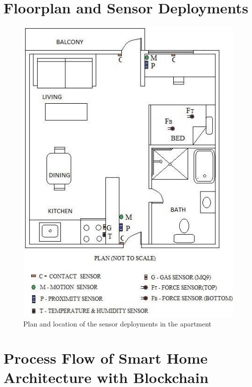 \begin{appendices}
    \section{Floorplan and Sensor Deployments \cite{joseMalekian2017}}\label{sec:floorplan-and-sensor-deployments}

    \begin{figure}[h!]
        \includegraphics[width=\linewidth]{datasets/images/A3}
        \caption{Plan and location of the sensor deployments in the apartment}\label{fig:figure6}
    \end{figure}



    \cleardoublepage

    \section{Process Flow of Smart Home Architecture with Blockchain \cite{arifEtAl_2020}}\label{sec:process-flow-of-smart-home-architecture-with-blockchain}


\end{appendices}
